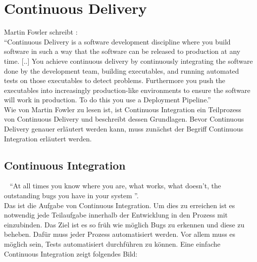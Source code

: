 \chapter{Continuous Delivery}
\label{chap:continuousDelivery}
Martin Fowler schreibt \cite{Fowler:CD}:
\\
"`Continuous Delivery is a software development discipline where you build software in such a way that the software can be released to production at any time. [..] You achieve continuous delivery by continuously integrating the software done by the development team, building executables, and running automated tests on those executables to detect problems. Furthermore you push the executables into increasingly production-like environments to ensure the software will work in production. To do this you use a Deployment Pipeline."' 
\\
Wie von Martin Fowler zu lesen ist, ist Continuous Integration ein Teilprozess von Continuous Delivery und beschreibt dessen Grundlagen. Bevor Continuous Delivery genauer erläutert werden kann, muss zunächst der Begriff Continuous Integration erläutert werden.

\section{Continuous Integration}\
\label{subsec:ContinuousIntegration}
"`At all times you know where you are, what works, what doesn't, the outstanding bugs you have in your system "'\cite{Fowler:CI}. 
\\
Das ist die Aufgabe von Continuous Integration. Um dies zu erreichen ist es notwendig jede Teilaufgabe innerhalb der Entwicklung in den Prozess mit einzubinden. Das Ziel ist es so früh wie möglich Bugs zu erkennen und diese zu beheben. Dafür muss jeder Prozess automatisiert werden. Vor allem muss es möglich sein, Tests automatisiert durchführen zu können. Eine einfache Continuous Integration zeigt folgendes Bild:

